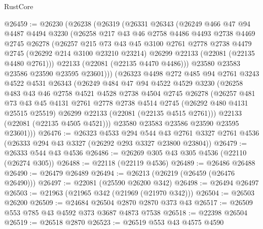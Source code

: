 \begin{lexlean}{RustCore}
\begin{coremodule}
@26459 := @26230
    (@26238
      (@26319
        (@26331
          @26343
          (@26249
            @466
            @47
            @94
            @4487
            @4494
            @3230
            (@26258
              @217
              @43
              @46
              @2758
              @4486
              @4493
              @2738
              @4469
              @2745
              @26278
              (@26257
                @215
                @73
                @43
                @45
                @3100
                @2761
                @2778
                @2738
                @4479
                @2745
                (@26292 @214 @3100 @23210 @23214)
                @26299
                @22133
                (@22081 (@22135 @4480 @2761)))
              @22133
              (@22081 (@22135 @4470 @4486)))
            @23580
            @23583
            @23586
            @23590
            @23595
            @23601)))
      (@26323
        @4498
        @272
        @485
        @94
        @2761
        @3243
        @4522
        @4531
        @26343
        (@26249
          @484
          @47
          @94
          @4522
          @4529
          @3230
          (@26258
            @483
            @43
            @46
            @2758
            @4521
            @4528
            @2738
            @4504
            @2745
            @26278
            (@26257
              @481
              @73
              @43
              @45
              @4131
              @2761
              @2778
              @2738
              @4514
              @2745
              (@26292 @480 @4131 @25515 @25519)
              @26299
              @22133
              (@22081 (@22135 @4515 @2761)))
            @22133
            (@22081 (@22135 @4505 @4521)))
          @23580
          @23583
          @23586
          @23590
          @23595
          @23601)))
@26476 := @26323
    @4533
    @294
    @544
    @43
    @2761
    @3327
    @2761
    @4536
    (@26333 @294 @43 @3327 (@26292 @293 @3327 @23800 @23804))
@26479 := @26333 @544 @43 @4536
@26486 := @26269 @305 @43 @305 @4536 (@22110 (@26274 @305))
@26488 := @22118 (@22119 @4536)
@26489 := @26486 @26488
@26490 := @26479 @26489
@26494 := @26213 (@26219 (@26459 (@26476 @26490)))
@26497 := @22081 (@25590 @26200 @342)
@26498 := @26494 @26497
@26503 := @21963 (@21965 @342 (@21969 (@21970 @342)))
@26504 := @26503 @26200
@26509 := @24684 @26504 @2870 @2870 @373 @43
@26517 := @26509 @553 @785 @43 @4592 @373 @3687 @4873 @7538
@26518 := @22398 @26504
@26519 := @26518 @2870
@26523 := @26519 @553 @43 @4575 @4590

\end{coremodule}
\end{lexlean}
